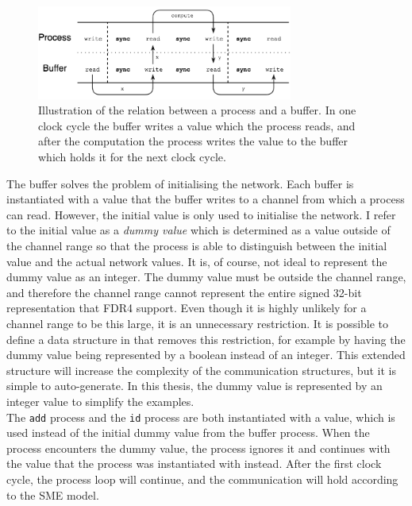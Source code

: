 \begin{figure}
\centering
\includegraphics[width=0.75\textwidth]{./figures/clock_cycle_thesis.png}
\caption{Illustration of the relation between a process and a buffer. In one clock cycle the buffer writes a value which the process reads, and after the computation the process writes the value to the buffer which holds it for the next clock cycle.}
\label{fig:clock_cycle}
\end{figure}
The buffer solves the problem of initialising the network. Each buffer is instantiated with a value that the buffer writes to a channel from which a process can read. However, the initial value is only used to initialise the network. I refer to the initial value as a \textit{dummy value} which is determined as a value outside of the channel range so that the process is able to distinguish between the initial value and the actual network values.
It is, of course, not ideal to represent the dummy value as an integer. The dummy value must be outside the channel range, and therefore the channel range cannot represent the entire signed 32-bit representation that FDR4 support. Even though it is highly unlikely for a channel range to be this large, it is an unnecessary restriction. It is possible to define a data structure in \cspm{} that removes this restriction, for example by having the dummy value being represented by a boolean instead of an integer. This extended structure will increase the complexity of the communication structures, but it is simple to auto-generate.
In this thesis, the dummy value is represented by an integer value to simplify the examples.\\

The \texttt{add} process and the \texttt{id} process are both instantiated with a value, which is used instead of the initial dummy value from the buffer process. When the process encounters the dummy value, the process ignores it and continues with the value that the process was instantiated with instead. After the first clock cycle, the process loop will continue, and the communication will hold according to the SME model.\\

